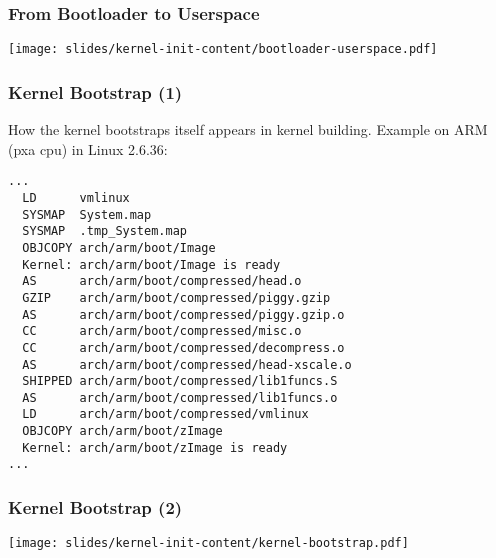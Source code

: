 \begin{frame}
  \frametitle{From Bootloader to Userspace}
  \begin{center}
    \texttt{[image: slides/kernel-init-content/bootloader-userspace.pdf]}
  \end{center}
\end{frame}

\begin{frame}[fragile]
  \frametitle{Kernel Bootstrap (1)}
  How the kernel bootstraps itself appears in kernel building.
  Example on ARM (pxa cpu) in Linux 2.6.36:
{\footnotesize
\begin{verbatim}
...
  LD      vmlinux
  SYSMAP  System.map
  SYSMAP  .tmp_System.map
  OBJCOPY arch/arm/boot/Image
  Kernel: arch/arm/boot/Image is ready
  AS      arch/arm/boot/compressed/head.o
  GZIP    arch/arm/boot/compressed/piggy.gzip
  AS      arch/arm/boot/compressed/piggy.gzip.o
  CC      arch/arm/boot/compressed/misc.o
  CC      arch/arm/boot/compressed/decompress.o
  AS      arch/arm/boot/compressed/head-xscale.o
  SHIPPED arch/arm/boot/compressed/lib1funcs.S
  AS      arch/arm/boot/compressed/lib1funcs.o
  LD      arch/arm/boot/compressed/vmlinux
  OBJCOPY arch/arm/boot/zImage
  Kernel: arch/arm/boot/zImage is ready
...
\end{verbatim}
}
\end{frame}

\begin{frame}
  \frametitle{Kernel Bootstrap (2)}
  \begin{center}
    \texttt{[image: slides/kernel-init-content/kernel-bootstrap.pdf]}
  \end{center}
\end{frame}


